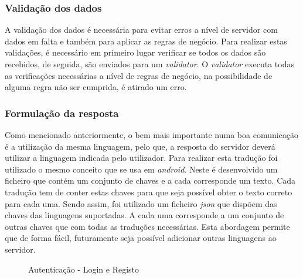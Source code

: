 \newpage

\subsubsection{Validação dos dados}
A validação dos dados é necessária para evitar erros a nível de servidor com dados em falta e também para aplicar as regras de negócio. Para realizar estas validações, é necessário em primeiro lugar verificar se todos os dados são recebidos, de seguida, são enviados para um \textit{validator}. O \textit{validator} executa todas as verificações necessárias a nível de regras de negócio, na possibilidade de alguma regra não ser cumprida, é atirado um erro.

\subsubsection{Formulação da resposta}
Como mencionado anteriormente, o bem mais importante numa boa comunicação é a utilização da mesma linguagem, pelo que, a resposta do servidor deverá utilizar a linguagem indicada pelo utilizador. Para realizar esta tradução foi utilizado o mesmo conceito que se usa em \textit{android}. Neste é desenvolvido um ficheiro que contém um conjunto de chaves e a cada corresponde um texto. Cada tradução tem de conter estas chaves para que seja possível obter o texto correto para cada uma. Sendo assim, foi utilizado um ficheiro \textit{json} que dispõem das chaves das linguagens suportadas. A cada uma corresponde a um conjunto de outras chaves que com todas as traduções necessárias. Esta abordagem permite que de forma fácil, futuramente seja possível adicionar outras linguagens ao servidor.

\begin{figure}[htb]%
 \centering
 \qquad
 \caption{Autenticação - Login e Registo}%
 \label{fig:24}
\end{figure}

